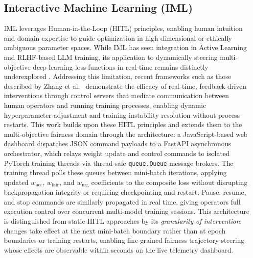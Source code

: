 \documentclass[12pt,a4paper]{article}
\begin{document}
\subsection{Interactive Machine Learning (IML)}
IML leverages Human-in-the-Loop (HITL) principles, enabling human intuition and domain expertise to guide optimization in high-dimensional or ethically ambiguous parameter spaces. While IML has seen integration in Active Learning and RLHF-based LLM training, its application to dynamically steering multi-objective deep learning loss functions in real-time remains distinctly underexplored \cite{amershi2014power}.
Addressing this limitation, recent frameworks such as those described by Zhang et al.\ \cite{zhang2025interactive} demonstrate the efficacy of real-time, feedback-driven interventions through control servers that mediate communication between human operators and running training processes, enabling dynamic hyperparameter adjustment and training instability resolution without process restarts. This work builds upon these HITL principles and extends them to the multi-objective fairness domain through the architecture: a JavaScript-based web dashboard dispatches JSON command payloads to a FastAPI asynchronous orchestrator, which relays weight update and control commands to isolated PyTorch training threads via thread-safe \texttt{queue.Queue} message brokers. The training thread polls these queues between mini-batch iterations, applying updated $w_{\text{acc}}$, $w_{\text{fair}}$, and $w_{\text{nrg}}$ coefficients to the composite loss without disrupting backpropagation integrity or requiring checkpointing and restart. Pause, resume, and stop commands are similarly propagated in real time, giving operators full execution control over concurrent multi-model training sessions.
This architecture is distinguished from static HITL approaches by its \emph{granularity of intervention}: changes take effect at the next mini-batch boundary rather than at epoch boundaries or training restarts, enabling fine-grained fairness trajectory steering whose effects are observable within seconds on the live telemetry dashboard.
\end{document}
